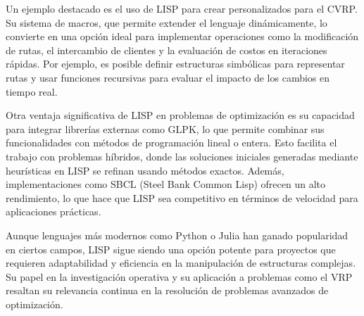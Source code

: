 \documentclass[12pt]{article}
\begin{document}
Un ejemplo destacado es el uso de LISP para crear  personalizados para el CVRP. Su sistema de macros, que permite extender el lenguaje dinámicamente, lo convierte en una opción ideal para implementar operaciones como la modificación de rutas, el intercambio de clientes y la evaluación de costos en iteraciones rápidas. Por ejemplo, es posible definir estructuras simbólicas para representar rutas y usar funciones recursivas para evaluar el impacto de los cambios en tiempo real.

Otra ventaja significativa de LISP en problemas de optimización es su capacidad para integrar librerías externas como GLPK, lo que permite combinar sus funcionalidades con métodos de programación lineal o entera. Esto facilita el trabajo con problemas híbridos, donde las soluciones iniciales generadas mediante heurísticas en LISP se refinan usando métodos exactos. Además, implementaciones como SBCL (Steel Bank Common Lisp) ofrecen un alto rendimiento, lo que hace que LISP sea competitivo en términos de velocidad para aplicaciones prácticas.

Aunque lenguajes más modernos como Python o Julia han ganado popularidad en ciertos campos, LISP sigue siendo una opción potente para proyectos que requieren adaptabilidad y eficiencia en la manipulación de estructuras complejas. Su papel en la investigación operativa y su aplicación a problemas como el VRP resaltan su relevancia continua en la resolución de problemas avanzados de optimización.




 
\end{document}
